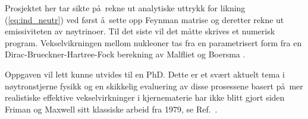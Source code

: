 Prosjektet her tar sikte p\aa\ rekne ut analytiske uttrykk for likning
(\ref{eq:ind_neutr}) ved f\o rst \aa\ sette opp Feynman matrise og deretter
rekne ut emissiviteten av n\o ytrinoer. Til det siste vil det m\aa tte skrives et numerisk program.
Vekselvikrningen mellom nukleoner tas fra en parametrisert form
fra en Dirac-Brueckner-Hartree-Fock berekning av Malfliet og Boersma
\cite{malfliet}.

Oppgaven vil lett kunne utvides til en PhD. Dette er et sv\ae rt aktuelt tema 
i n\o ytronstjerne fysikk og en skikkelig evaluering av disse prosessene 
basert p\aa\ mer realistiske effektive vekselvirkninger i kjernematerie
har ikke blitt gjort siden Friman og Maxwell sitt klassiske arbeid fra
1979, se Ref.~\cite{fm79}.





